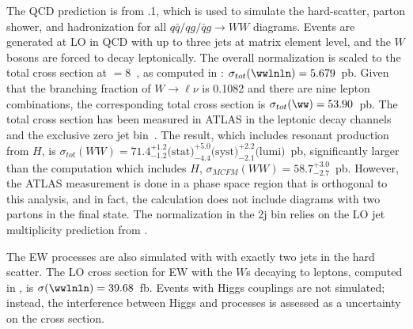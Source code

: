 The QCD \ww prediction is from .1, which is used to
simulate the
hard-scatter, parton shower, and hadronization for all
$q\bar{q}/qg/\bar{q}g\rightarrow{WW}$ diagrams. Events are generated
at LO in QCD with up to three jets at matrix element level, and the
$W$ bosons are
forced to decay leptonically. The overall normalization is
scaled to the total \ww cross section at \sqrts$=8$~\tev, as computed
in \MCFM: $\sigma_{tot}(\wwlnln) = 5.679$~pb. Given that the branching
fraction of $W\rightarrow{\ell\nu}$ is 0.1082 and there are nine
lepton combinations, the corresponding total cross section is
$\sigma_{tot}(\ww) = 53.90$~pb. The total \ww cross section has been
measured in ATLAS in the \ww leptonic decay channels and the exclusive
zero jet
bin~\cite{bib:ww_cross_section}. The result, which includes
resonant \ww production from $H$, is
$\sigma_{tot}(WW) = 71.4^{+1.2}_{-1.2} \textrm{(stat)} ^{+5.0}_{-4.4}
\textrm{(syst)}^{+2.2}_{-2.1}\textrm{(lumi)}$~pb, significantly larger
than the \MCFM computation which includes $H$, $\sigma_{MCFM}(WW) =
58.7^{+3.0}_{-2.7}$~pb. However, the ATLAS measurement is done in a
phase space
region that is orthogonal to this analysis, and in fact, the \MCFM
calculation does not include diagrams with two partons in the final
state. The normalization in the 2j bin relies on the LO jet
multiplicity prediction
from \SHERPA.

The EW \ww processes are also simulated with \SHERPA with exactly two
jets in the hard scatter. The LO cross section for EW \ww with the
$W$s decaying to leptons, computed in \SHERPA, is $\sigma(\wwlnln) =
39.68$~fb. Events with Higgs couplings are not simulated; instead, the
interference between Higgs and \ww processes is assessed as a
uncertainty on the cross section.



